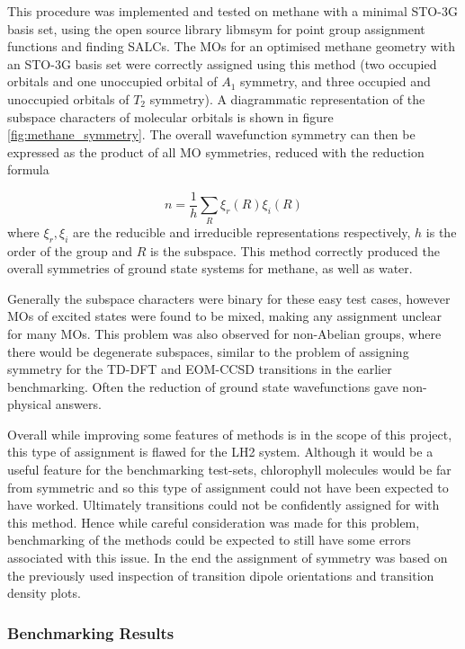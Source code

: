 This procedure was implemented and tested on methane with a minimal STO-3G basis set,
using the open source library libmsym \cite{libmsym} for point group assignment
functions and finding SALCs. The MOs for an optimised methane geometry with an STO-3G 
basis set were correctly assigned using this method (two occupied orbitals and one
unoccupied orbital of $A_1$ symmetry, and three occupied and unoccupied orbitals
of $T_2$ symmetry). A diagrammatic representation of the subspace characters of
molecular orbitals is shown in figure \ref{fig:methane_symmetry}. The overall wavefunction
symmetry can then be expressed as the product of all MO symmetries, reduced with
the reduction formula

\begin{equation}
n = \frac{1}{h} \sum_R \xi_r \left( R \right) \xi_i \left( R \right)
\end{equation}
%
where $\xi_r, \xi_i$ are the reducible and irreducible representations respectively,
$h$ is the order of the group and $R$ is the subspace. This method correctly produced
the overall symmetries of ground state systems for methane, as well as water.

Generally the subspace characters were binary for these easy test cases, however 
MOs of excited states were found to be mixed, making any assignment unclear for
many MOs. This problem was also observed for non-Abelian groups, where there would 
be degenerate subspaces, similar to the problem of assigning symmetry for the TD-DFT 
and EOM-CCSD transitions in the earlier benchmarking. Often the reduction of ground
state wavefunctions gave non-physical answers.

Overall while improving some features of \dscf methods is in the scope of this project,
this type of assignment is flawed for the LH2 system. Although it would be a useful 
feature for the benchmarking test-sets, chlorophyll molecules would be far from
symmetric and so this type of assignment could not have been expected to have worked.
Ultimately transitions could not be confidently assigned for \dscf with this method.
Hence while careful consideration was made for this problem, benchmarking of the
\dxtb methods could be expected to still have some errors associated with this issue.
In the end the assignment of symmetry was based on the previously used inspection
of transition dipole orientations and transition density plots.

\subsubsection{\dxtb Benchmarking Results}
\label{subsubsec:imp_of_benchmarking}


